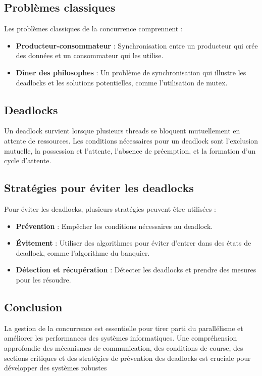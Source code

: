 \subsection{Problèmes classiques}
Les problèmes classiques de la concurrence comprennent :
\begin{itemize}
    \item \textbf{Producteur-consommateur} : Synchronisation entre un producteur qui crée des données et un consommateur qui les utilise.
    \item \textbf{Dîner des philosophes} : Un problème de synchronisation qui illustre les deadlocks et les solutions potentielles, comme l'utilisation de mutex.
\end{itemize}

\subsection{Deadlocks}
Un deadlock survient lorsque plusieurs threads se bloquent mutuellement en attente de ressources. 
Les conditions nécessaires pour un deadlock sont l'exclusion mutuelle, la possession et l'attente, l'absence de préemption, et la formation d'un cycle d'attente.

\subsection{Stratégies pour éviter les deadlocks}
Pour éviter les deadlocks, plusieurs stratégies peuvent être utilisées :
\begin{itemize}
    \item \textbf{Prévention} : Empêcher les conditions nécessaires au deadlock.
    \item \textbf{Évitement} : Utiliser des algorithmes pour éviter d'entrer dans des états de deadlock, comme l'algorithme du banquier.
    \item \textbf{Détection et récupération} : Détecter les deadlocks et prendre des mesures pour les résoudre.
\end{itemize}

\subsection{Conclusion}
La gestion de la concurrence est essentielle pour tirer parti du parallélisme et améliorer les performances des systèmes informatiques. 
Une compréhension approfondie des mécanismes de communication, des conditions de course, des sections critiques et des stratégies de prévention des deadlocks est cruciale pour développer des systèmes robustes
